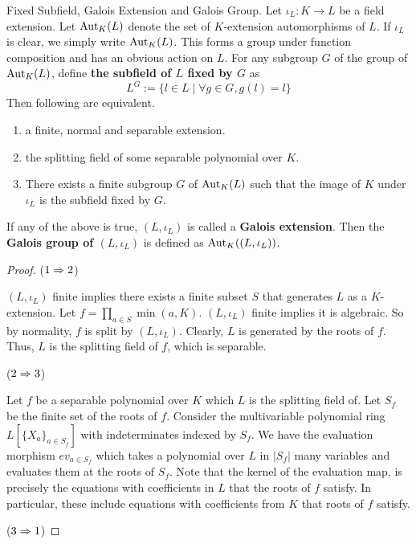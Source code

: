 \documentclass[../book.tex]{subfiles}
\begin{document}
\begin{dfn} Fixed Subfield, Galois Extension and Galois Group.
    Let $\iota_L : K \to L$ be a field extension.
    Let $\text{Aut}_{K}(L)$ denote the set of $K$-extension automorphisms of $L$.
    If $\iota_L$ is clear, we simply write $\text{Aut}_{K}(L)$. 
    This forms a group under function composition and has an obvious action on $L$. 
    For any subgroup $G$ of the group of $\text{Aut}_{K}(L)$, 
    define \textbf{the subfield of $L$ fixed by $G$} as
    \[ L^G := \{l \in L \mid \forall g \in G, g(l)=l\} \]
    Then following are equivalent.
    \begin{enumerate}
        \item a finite, normal and separable extension.
        \item the splitting field of some separable polynomial over $K$. 
        \item There exists a finite subgroup $G$ of $\text{Aut}_{K}(L)$ such that
        the image of $K$ under $\iota_L$ is the subfield fixed by $G$. 
    \end{enumerate} 
    If any of the above is true, $(L,\iota_L)$ is called 
    a \textbf{Galois extension}.
    Then the \textbf{Galois group of $(L,\iota_L)$} is defined as 
    $\text{Aut}_{K}((L,\iota_L))$.
\end{dfn}
\begin{proof}
    ($1\Rightarrow 2$)
        
        $(L,\iota_L)$ finite implies there exists a finite subset $S$
        that generates $L$ as a $K$-extension. 
        Let $f = \prod_{a\in S} \min(a,K)$. 
        $(L,\iota_L)$ finite implies it is algebraic. 
        So by normality, $f$ is split by $(L,\iota_L)$.
        Clearly, $L$ is generated by the roots of $f$.
        Thus, $L$ is the splitting field of $f$, which is separable. 
        
    ($2\Rightarrow 3$)
        
        Let $f$ be a separable polynomial over $K$ 
        which $L$ is the splitting field of.
        Let $S_f$ be the finite set of the roots of $f$. 
        Consider the multivariable polynomial ring $L[\{X_a\}_{a\in S_f}]$
        with indeterminates indexed by $S_f$. 
        We have the evaluation morphism $ev_{a\in S_f}$
        which takes a polynomial over $L$ in $|S_f|$ many variables
        and evaluates them at the roots of $S_f$. 
        Note that the kernel of the evaluation map, 
        is precisely the equations with coefficients in $L$ that
        the roots of $f$ satisfy. 
        In particular, these include equations with coefficients from $K$
        that roots of $f$ satisfy. 
        
        
    ($3\Rightarrow 1$)
\end{proof}
\end{document}
